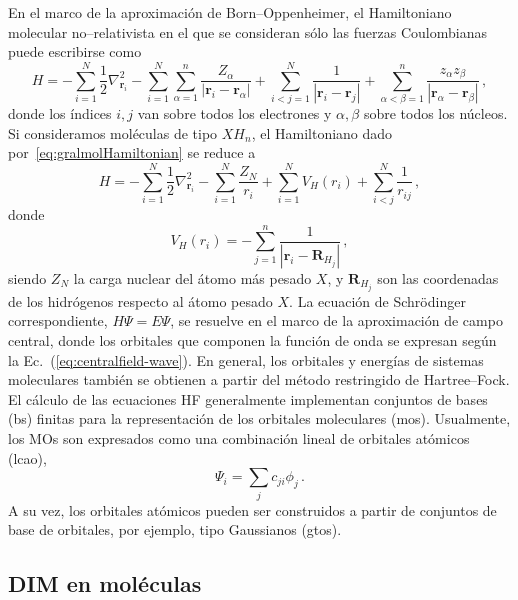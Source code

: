 En el marco de la aproximación de Born--Oppenheimer, el Hamiltoniano 
molecular no--relativista en el que se consideran sólo las fuerzas Coulombianas puede escribirse como
\begin{equation}
H = - \sum_{i=1}^N \frac{1}{2} \nabla^2_{\mathbf{r}_i} 
    - \sum_{i=1}^N \sum_{\alpha=1}^n \frac{Z_{\alpha}}{
    \left|\mathbf{r}_i-\mathbf{r}_{\alpha}\right|} 
    + \sum_{i<j=1}^N \frac{1}{\left|\mathbf{r}_i-\mathbf{r}_j\right|} 
    + \sum_{\alpha<\beta=1}^n \frac{z_{\alpha}z_{\beta}}{
    \left|\mathbf{r}_{\alpha}-\mathbf{r}_{\beta}\right|}\,,
\label{eq:gralmolHamiltonian}
\end{equation}
donde los índices $i,j$ van sobre todos los electrones y $\alpha,\beta$ 
sobre todos los núcleos. Si consideramos moléculas de tipo $X\!H_n$, el 
Hamiltoniano dado por~\ref{eq:gralmolHamiltonian} se reduce a 
\begin{equation}
H = -\sum_{i=1}^N \frac{1}{2} \nabla^2_{\mathbf{r}_i} 
    - \sum_{i=1}^N \frac{Z_N}{r_i} 
    + \sum_{i=1}^N V_H(r_i)
    + \sum_{i<j}^N \frac{1}{r_{ij}}\,,
\end{equation}
donde
\begin{equation}
 V_H(r_i)=-\sum_{j=1}^{n} \frac{1}{\left|\mathbf{r}_i-\mathbf{R}_{H_j}\right|}\,,
\label{eq:Vhidrogenos}
\end{equation}
siendo $Z_N$ la carga nuclear del átomo más pesado $X$, y 
$\mathbf{R}_{H_j}$ son las coordenadas de los hidrógenos respecto al 
átomo pesado $X$. La ecuación de Schr\"odinger correspondiente, 
$H\Psi=E\Psi$, se resuelve en el marco de la aproximación de campo 
central, donde los orbitales que componen la función de onda se expresan 
según la Ec.~(\ref{eq:centralfield-wave}). En general, los orbitales y 
energías de sistemas moleculares también se obtienen a partir del método 
restringido de Hartree--Fock. El cálculo de las ecuaciones HF 
generalmente implementan conjuntos de bases (\acs{bs}) finitas para la 
representación de los orbitales moleculares (\acsp{mo}). Usualmente, los 
MOs son expresados como una combinación lineal de orbitales atómicos 
(\acs{lcao}), 
\begin{equation}
 \Psi_i=\sum_j c_{ji} \phi_j\,.
\end{equation}
A su vez, los orbitales atómicos pueden ser construidos a partir de 
conjuntos de base de orbitales, por ejemplo, tipo Gaussianos 
(\acsp{gto}).

\subsection{DIM en moléculas}
\label{sec:dimmoleculas}

